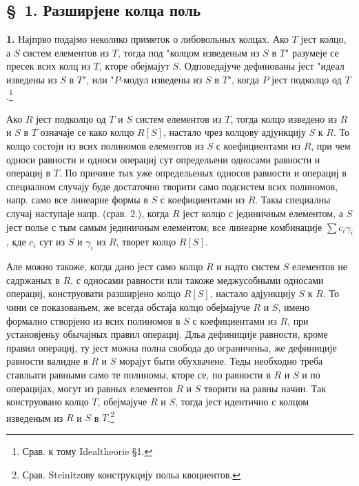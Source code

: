 \documentclass[11pt]{article}
\begin{document}
\setcounter{footnote}{9}

\subsection*{\S~1. Разширјене колца поль}

\textbf{1.} Најпрво подајмо неколико приметок о либовольных колцах. Ако $T$ јест колцо, а $S$ систем елементов из $T$, тогда под "колцом изведеным из $S$ в $T$" разумеје се пресек всих колц из $T$, кторе обејмајут $S$. Одповедајуче дефинованы јест "идеал изведены из $S$ в $T$", или "$P$-модул изведены из $S$ в $T$", когда $P$ јест подколцо од $T$.\footnote{Срав. к тому Idealtheorie \S 1.}

Ако $R$ јест подколцо од $T$ и $S$ систем елементов из $T$, тогда колцо изведено из $R$ и $S$ в $T$ означаје се како колцо $R[S]$, настало чрез колцову адјункцију $S$ к $R$. То колцо состоји из всих полиномов елементов из $S$ с коефициентами из $R$, при чем односи равности и односи операциј сут определьени односами равности и операциј в $T$. По причине тых уже определьеных односов равности и операциј в специалном случају буде достаточно творити само подсистем всих полиномов, напр. само все линеарне формы в $S$ с коефициентами из $R$. Такы специалны случај наступаје напр. (срав. 2.), когда $R$ јест колцо с јединичным елементом, а $S$ јест полье с тым самым јединичным елементом; все линеарне комбинације $\sum c_i\gamma_i$, кде $c_i$ сут из $S$ и $\gamma_i$ из $R$, творет колцо $R[S]$.

Але можно такоже, когда дано јест само колцо $R$ и надто систем $S$ елементов не садржаных в $R$, с односами равности или такоже меджусобными односами операциј, конструовати разширјено колцо $R[S]$, настало адјункцију $S$ к $R$. То чини се показованьем, же всегда обстаја колцо обејмајуче $R$ и $S$, имено формално створјено из всих полиномов в $S$ с коефициентами из $R$, при установјеньу обычајных правил операциј. Дльа дефиниције равности, кроме правил операциј, ту јест можна полна свобода до ограниченьа, же дефиниције равности валидне в $R$ и $S$ морајут быти обухвачене. Теды необходно треба ставльати равными само те полиномы, кторе се, по равности в $R$ и $S$ и по операцијах, могут из равных елементов $R$ и $S$ творити на равны начин. Так конструовано колцо $T$, обејмајуче $R$ и $S$, тогда јест идентично с колцом изведеным из $R$ и $S$ в $T$.\footnote{Срав. Steinitzову конструкцију польа квоциентов.}
\end{document}
